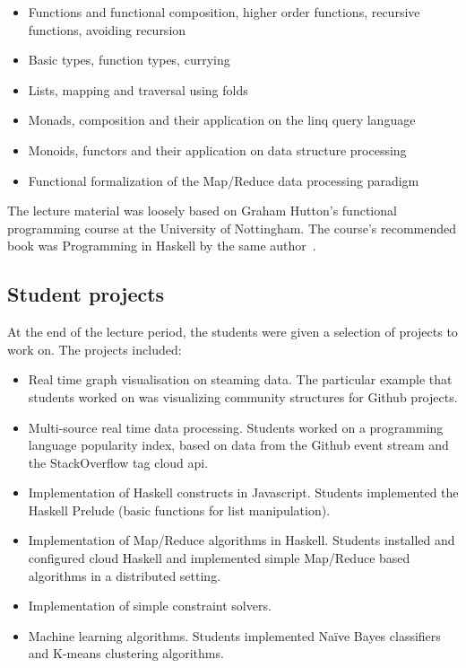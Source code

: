 \documentclass[conference]{IEEEtran}
\begin{document}
\begin{itemize}

  \item Functions and functional composition, higher order functions, recursive
    functions, avoiding recursion

  \item Basic types, function types, currying

  \item Lists, mapping and traversal using folds

  \item Monads, composition and their application on the {\sc linq} query 
    language~\cite{Meije11}

  \item Monoids, functors and their application on data structure processing

  \item Functional formalization of the Map/Reduce data processing
    paradigm~\cite{Lamme08}

\end{itemize}

The lecture material was loosely based on Graham Hutton's functional programming
course at the University of Nottingham. The course's recommended book was
Programming in Haskell by the same author~\cite{Hutto07}.

\subsection{Student projects}

At the end of the lecture period, the students were given a selection of
projects to work on. The projects included:

\begin{itemize}

  \item Real time graph visualisation on steaming data. The
    particular example that students worked on was visualizing community
    structures for Github projects.

  \item Multi-source real time data processing. Students worked on a 
    programming language popularity index, based on data from the Github
    event stream and the StackOverflow tag cloud {\sc api}.

  \item Implementation of Haskell constructs in Javascript. Students implemented
    the Haskell Prelude (basic functions for list manipulation).

  \item Implementation of Map/Reduce algorithms in Haskell. Students installed
    and configured cloud Haskell and implemented simple Map/Reduce based
    algorithms in a distributed setting.

  \item Implementation of simple constraint solvers.
  
  \item Machine learning algorithms. Students implemented Na\"ive Bayes 
    classifiers and K-means clustering algorithms.

\end{itemize}
\end{document}
